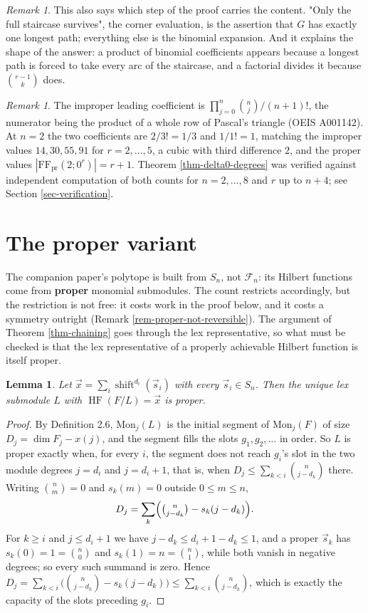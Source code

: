 \documentclass[11pt, a4paper, abstract=yes]{scrartcl}
\theoremstyle{definition}
\theoremstyle{remark}
\newtheorem{remark}[definition]{Remark}
\theoremstyle{plain}
\newtheorem{lemma}[definition]{Lemma}
\newcommand{\shift}{\operatorname{shift}}
\newcommand{\HF}{\operatorname{HF}}
\begin{document}
\begin{remark}
This also says which step of the proof carries the content. "Only the full staircase survives", the
corner evaluation, is the assertion that \(G\) has exactly one longest path; everything else is the
binomial expansion. And it explains the shape of the answer: a product of binomial coefficients
appears because a longest path is forced to take every arc of the staircase, and a factorial divides
it because \(\binom{r-1}{k}\) does.
\label{rem-delta0-digraph}
\end{remark}

\begin{remark}
The improper leading coefficient is \(\prod_{j=0}^{n}\binom nj\big/(n+1)!\), the numerator being the
product of a whole row of Pascal's triangle (OEIS A001142). At \(n=2\) the two coefficients are
\(2/3!=1/3\) and \(1/1!=1\), matching the improper values \(14,30,55,91\) for \(r=2,\dots,5\), a
cubic with third difference \(2\), and the proper values
\(|\mathrm{FF}_{\mathrm{pr}}(2;0^r)|=r+1\). Theorem \ref{thm-delta0-degrees} was verified against
independent computation of both counts for \(n=2,\dots,8\) and \(r\) up to \(n+4\); see
Section \ref{sec-verification}.
\label{rem-delta0-degrees}
\end{remark}
\section{The proper variant}
\label{sec-proper}
The companion paper's polytope is built from \(S_n\), not \(\mathcal F_n\): its Hilbert functions come
from \textbf{proper} monomial submodules. The count restricts accordingly, but the restriction is not free:
it costs work in the proof below, and it costs a symmetry outright (Remark
\ref{rem-proper-not-reversible}).
The argument of Theorem \ref{thm-chaining} goes through the lex representative, so what must be checked
is that the lex representative of a properly achievable Hilbert function is itself proper.

\begin{lemma}
Let \(\vec x=\sum_i\shift^{d_i}(\vec s_i)\) with every \(\vec s_i\in S_n\). Then the unique lex submodule
\(L\) with \(\HF(F/L)=\vec x\) is proper.
\label{lem-lexproper}
\end{lemma}

\begin{proof}
By Definition 2.6, \(\mathrm{Mon}_j(L)\) is the initial segment of \(\mathrm{Mon}_j(F)\) of size
\(D_j=\dim F_j-x(j)\), and the segment fills the slots \(g_1,g_2,\dots\) in order. So \(L\) is proper
exactly when, for every \(i\), the segment does not reach \(g_i\)'s slot in the two module degrees
\(j=d_i\) and \(j=d_i+1\), that is, when \(D_j\le\sum_{k<i}\binom n{j-d_k}\) there. Writing
\(\binom nm=0\) and \(s_k(m)=0\) outside \(0\le m\le n\),
\[
  D_j=\sum_k\Bigl(\tbinom n{j-d_k}-s_k(j-d_k)\Bigr).
\]
For \(k\ge i\) and \(j\le d_i+1\) we have \(j-d_k\le d_i+1-d_k\le1\), and a proper \(\vec s_k\) has
\(s_k(0)=1=\binom n0\) and \(s_k(1)=n=\binom n1\), while both vanish in negative degrees; so every
such summand is zero. Hence \(D_j=\sum_{k<i}\bigl(\binom n{j-d_k}-s_k(j-d_k)\bigr)\le
\sum_{k<i}\binom n{j-d_k}\), which is exactly the capacity of the slots preceding \(g_i\).
\end{proof}
\end{document}
